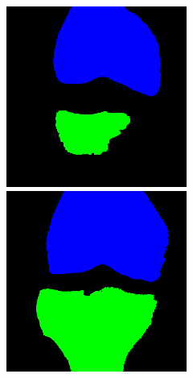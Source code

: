 \begin{figure}[H]
\endminipage
\vspace{0.15cm}
  \includegraphics[width=\linewidth]{imgs/y1.png}
\endminipage\hfill
{}
  \includegraphics[width=\linewidth]{imgs/y2.png}

\end{figure}
